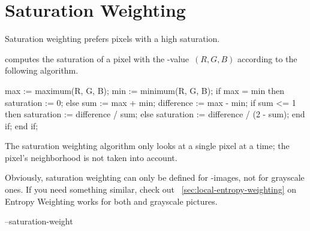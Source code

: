 

\section[Saturation Weighting]{\label{sec:saturation-weighting}%
  Saturation Weighting}

Saturation weighting prefers pixels with a high saturation.

\App{} computes the saturation of a pixel with the -value~$(R, G, B)$ according to
the following algorithm.

\begin{adalisting}
max := maximum(R, G, B);
min := minimum(R, G, B);
if max = min then
    saturation := 0;
else
    sum := max + min;
    difference := max - min;
    if sum <= 1 then
        saturation := difference / sum;
    else
        saturation := difference / (2 - sum);
    end if;
end if;
\end{adalisting}

The saturation weighting algorithm only looks at a single pixel at a time; the pixel's
neighborhood is not taken into account.

Obviously, saturation weighting can only be defined for
-images, not for grayscale ones.  If you need something similar, check out
\sectionName~\ref{sec:local-entropy-weighting} on Entropy Weighting works for both 
and grayscale pictures.

\begin{optionsummary}
\item[--saturation-weight] \sectionName~
\end{optionsummary}


